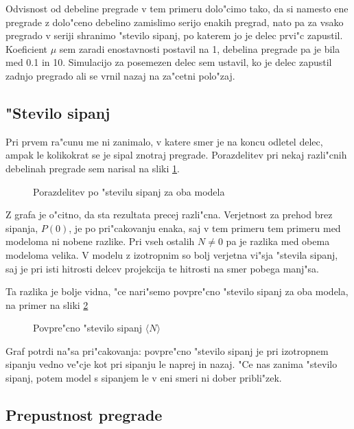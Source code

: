 \documentclass[a4paper,10pt]{article}
\begin{document}
Odvisnost od debeline pregrade v tem primeru dolo"cimo tako, da si namesto ene pregrade z dolo"ceno debelino zamislimo serijo enakih pregrad, nato pa za vsako pregrado v seriji shranimo "stevilo sipanj, po katerem jo je delec prvi"c zapustil. Koeficient $\mu$ sem zaradi enostavnosti postavil na 1, debelina pregrade pa je bila med 0.1 in 10. Simulacijo za posemezen delec sem ustavil, ko je delec zapustil zadnjo pregrado ali se vrnil nazaj na za"cetni polo"zaj. 

\subsection{"Stevilo sipanj}

Pri prvem ra"cunu me ni zanimalo, v katere smer je na koncu odletel delec, ampak le kolikokrat se je sipal znotraj pregrade. Porazdelitev pri nekaj razli"cnih debelinah pregrade sem narisal na sliki \ref{fig:ref-sipanja}. 

\begin{figure}[h!]

\caption{Porazdelitev po "stevilu sipanj za oba modela} 
\label{fig:ref-sipanja}
\end{figure}

Z grafa je o"citno, da sta rezultata precej razli"cna. Verjetnost za prehod brez sipanja, $P(0)$, je po pri"cakovanju enaka, saj v tem primeru tem primeru med modeloma ni nobene razlike. Pri vseh ostalih $N\neq 0$ pa je razlika med obema modeloma velika. V modelu z izotropnim so bolj verjetna vi"sja "stevila sipanj, saj je pri isti hitrosti delcev projekcija te hitrosti na smer pobega manj"sa. 

Ta razlika je bolje vidna, "ce nari"semo povpre"cno "stevilo sipanj za oba modela, na primer na sliki \ref{fig:ref-povp-sipanja}

\begin{figure}[h!]

\caption{Povpre"cno "stevilo sipanj $\langle N \rangle$} 
\label{fig:ref-povp-sipanja}
\end{figure}

Graf potrdi na"sa pri"cakovanja: povpre"cno "stevilo sipanj je pri izotropnem sipanju vedno ve"cje kot pri sipanju le naprej in nazaj. "Ce nas zanima "stevilo sipanj, potem model s sipanjem le v eni smeri ni dober pribli"zek. 

\subsection{Prepustnost pregrade}
\end{document}
